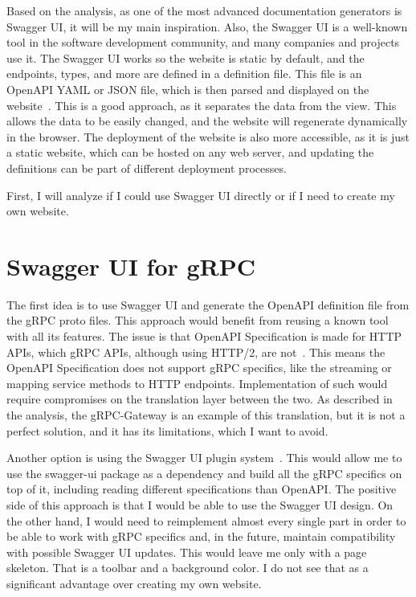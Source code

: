 Based on the analysis, as one of the most advanced documentation generators is Swagger UI, it will be my main inspiration.
Also, the Swagger UI is a well-known tool in the software development community, and many companies and projects use it.
The Swagger UI works so the website is static by default, and the endpoints, types, and more are defined in a definition file.
This file is an OpenAPI YAML or JSON file, which is then parsed and displayed on the website~\cite{swagger-ui-definition-file}.
This is a good approach, as it separates the data from the view.
This allows the data to be easily changed, and the website will regenerate dynamically in the browser.
The deployment of the website is also more accessible, as it is just a static website, which can be hosted on any web server, and updating the definitions can be part of different deployment processes.

First, I will analyze if I could use Swagger UI directly or if I need to create my own website.


\section{Swagger UI for gRPC}
The first idea is to use Swagger UI and generate the OpenAPI definition file from the gRPC proto files.
This approach would benefit from reusing a known tool with all its features.
The issue is that OpenAPI Specification is made for HTTP APIs, which gRPC APIs, although using HTTP/2, are not~\cite{openapi-specification}.
This means the OpenAPI Specification does not support gRPC specifics, like the streaming or mapping service methods to HTTP endpoints.
Implementation of such would require compromises on the translation layer between the two.
As described in the analysis, the gRPC-Gateway is an example of this translation, but it is not a perfect solution, and it has its limitations, which I want to avoid.

Another option is using the Swagger UI plugin system~\cite{swagger-ui-plugins}.
This would allow me to use the swagger-ui package as a dependency and build all the gRPC specifics on top of it, including reading different specifications than OpenAPI\@.
The positive side of this approach is that I would be able to use the Swagger UI design.
On the other hand, I would need to reimplement almost every single part in order to be able to work with gRPC specifics and, in the future, maintain compatibility with possible Swagger UI updates.
This would leave me only with a page skeleton.
That is a toolbar and a background color.
I do not see that as a significant advantage over creating my own website.

